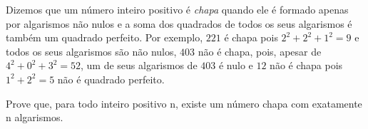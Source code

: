 Dizemos que um número inteiro positivo é \textit{chapa} quando ele é formado apenas por algarismos não nulos e a soma dos quadrados de todos os seus algarismos é também um quadrado perfeito.
Por exemplo, $221$ é chapa pois $2^2 + 2^2 + 1^2 = 9$ e todos os seus algarismos são não nulos, $403$ não é chapa, pois, apesar de $4^2 + 0^2 + 3^2 = 52$, um de seus algarismos de $403$ é nulo e $12$ não é chapa pois $1^2 + 2^2 = 5$ não é quadrado perfeito. 

Prove que, para todo inteiro positivo n, existe um número chapa com exatamente n algarismos.